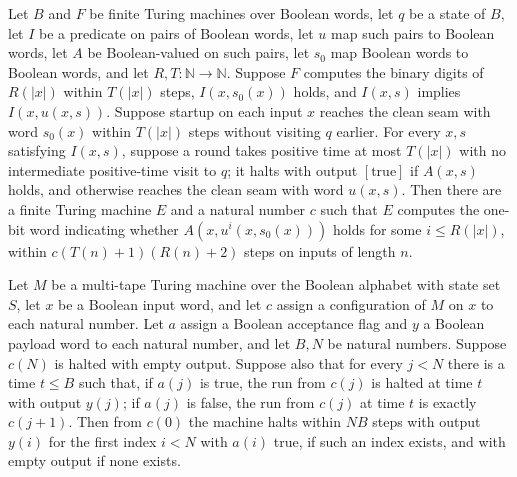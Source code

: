 \begin{theorem}
\label{Turing.FinTM.exists_loopTM}
\leanok
{}
Let $B$ and $F$ be finite Turing machines over Boolean words, let $q$ be a state of $B$,
let $I$ be a predicate on pairs of Boolean words, let $u$ map such pairs to Boolean
words, let $A$ be Boolean-valued on such pairs, let $s_0$ map Boolean words to Boolean
words, and let $R,T : \mathbb{N} \to \mathbb{N}$. Suppose $F$ computes the binary
digits of $R(|x|)$ within $T(|x|)$ steps, $I(x,s_0(x))$ holds, and $I(x,s)$ implies
$I(x,u(x,s))$. Suppose startup on each input $x$ reaches the clean seam with word
$s_0(x)$ within $T(|x|)$ steps without visiting $q$ earlier. For every $x,s$ satisfying
$I(x,s)$, suppose a round takes positive time at most $T(|x|)$ with no intermediate
positive-time visit to $q$; it halts with output $[\mathrm{true}]$ if $A(x,s)$ holds,
and otherwise reaches the clean seam with word $u(x,s)$. Then there are a finite Turing
machine $E$ and a natural number $c$ such that $E$ computes the one-bit word indicating
whether $A(x,u^i(x,s_0(x)))$ holds for some $i\le R(|x|)$, within $c(T(n)+1)(R(n)+2)$
steps on inputs of length $n$.
\end{theorem}

\begin{lemma}
\label{Turing.FinTM.loop_find_run}
\leanok
{}
Let $M$ be a multi-tape Turing machine over the Boolean alphabet with state set $S$, let
$x$ be a Boolean input word, and let $c$ assign a configuration of $M$ on $x$ to each
natural number. Let $a$ assign a Boolean acceptance flag and $y$ a Boolean payload word
to each natural number, and let $B,N$ be natural numbers. Suppose $c(N)$ is halted with
empty output. Suppose also that for every $j<N$ there is a time $t\le B$ such that, if
$a(j)$ is true, the run from $c(j)$ is halted at time $t$ with output $y(j)$; if $a(j)$
is false, the run from $c(j)$ at time $t$ is exactly $c(j+1)$. Then from $c(0)$ the
machine halts within $N B$ steps with output $y(i)$ for the first index $i<N$ with
$a(i)$ true, if such an index exists, and with empty output if none exists.
\end{lemma}

